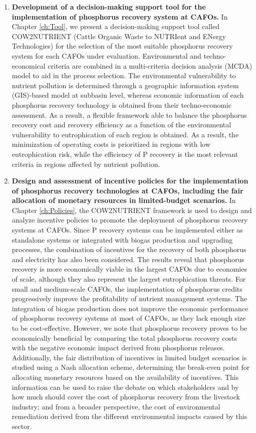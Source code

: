 \begin{enumerate}[font=\bfseries]
	\item \textbf{Development of a decision-making support tool for the implementation of phosphorus recovery system at CAFOs.} In Chapter \ref{ch:Tool}, we present a decision-making support tool called  COW2NUTRIENT (Cattle Organic
	Waste to NUTRIent and ENergy Technologies) for the
	selection of the most suitable phosphorus recovery system for each CAFOs under evaluation. Environmental and techno-economical criteria are combined in a multi-criteria decision analysis
	(MCDA) model to aid in the process selection. The environmental vulnerability to nutrient pollution is determined through a geographic information system (GIS)-based model at subbasin level, whereas economic information of each phosphorus recovery technology is obtained from their techno-economic assessment. As a result, a flexible framework able to balance the phosphorus recovery cost and recovery efficiency as a function of the environmental vulnerability to
	eutrophication of each region is obtained. As a result, the minimization of operating costs is
	prioritized in regions with low eutrophication risk, while the efficiency
	of P recovery is the most relevant criteria in regions affected by nutrient
	pollution.
	
	
	\item \textbf{Design and assessment of incentive policies for the implementation of phosphorus recovery technologies at CAFOs, including the fair allocation of monetary resources in limited-budget scenarios.} In Chapter \ref{ch:Policies}, the COW2NUTRIENT framework is used to design and analyze incentive policies to promote the deployment of phosphorus recovery systems at CAFOs. Since P recovery systems can be implemented either as standalone systems or integrated with biogas production and upgrading processes, the combination of incentives for the recovery	of both phosphorus and electricity has also been considered. The results reveal that phosphorus recovery is more economically viable in the largest CAFOs due to economies of scale, although they also represent the largest eutrophication threats. For small and medium-scale CAFOs, the implementation of phosphorus credits progressively improve the	profitability of nutrient management systems. The integration of biogas production does not improve the economic performance of phosphorus recovery systems at most of CAFOs, as they lack enough size to be cost-effective. However, we note that phosphorus recovery proves to be economically beneficial by comparing the total phosphorus recovery costs with the negative economic impact derived from phosphorus releases. Additionally, the fair distribution of incentives in limited budget scenarios is studied using a Nash allocation scheme, determining the break-even point for allocating monetary resources based on the availability of incentives. This information can be used to raise the debate on which stakeholders and by how much should cover the cost of phosphorus recovery from the livestock industry; and from a broader perspective, the cost of environmental remediation derived from the
	different environmental impacts caused by this sector.
	

\end{enumerate}
